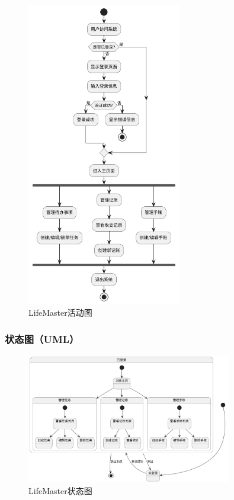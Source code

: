 \documentclass[a4paper]{article}
\begin{document}
\begin{figure}[H]
\centering
\includegraphics[width=0.6\textwidth]{img/activity_diagram.png}
\caption{LifeMaster活动图}
\end{figure}

\subsubsection{状态图（UML）}

\begin{figure}[H]
\centering
\includegraphics[width=0.8\textwidth]{img/state_diagram.png}
\caption{LifeMaster状态图}
\end{figure}
\end{document}

